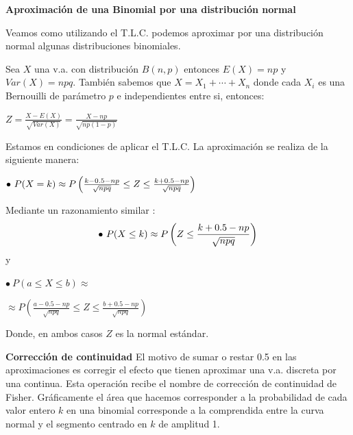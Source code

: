 \documentclass[12pt]{report}
\begin{document}
    \textbf{Aproximación de una Binomial por una distribución normal}

    Veamos como utilizando el T.L.C. podemos aproximar por una
    distribución normal algunas distribuciones binomiales.

    Sea $X$ una v.a. con distribución $B(n,p)$ entonces $E(X)=np$
    y $Var(X)=npq$. También sabemos que $X=X_{1}+\cdots + X_{n}$ donde
    cada $X_{i}$ es una Bernouilli de parámetro $p$ e independientes
    entre si, entonces:

    $Z=\frac{X-E(X)}{\sqrt{Var(X)}}=\frac{X-np}{\sqrt{np(1-p)}}$

    Estamos en condiciones de aplicar el T.L.C.
La aproximación se realiza de la siguiente manera:

$\bullet\  P(X=k)\approx P\left({{k-0.5-np}\over \sqrt{npq}}\leq Z \leq {{k+0.5-np}\over
\sqrt{npq}}\right)$


Mediante un razonamiento similar : $$\bullet\ P(X\leq k)\approx P\left(Z \leq
{{k+0.5-np}\over \sqrt{npq}}\right)$$ y

$\bullet\ P(a\leq X\leq b)\approx$

$\approx P\left(\frac{a-0.5-np}{\sqrt{npq}}\leq Z \leq \frac{b+0.5-np}{\sqrt{npq}}\right)$


Donde, en ambos casos $Z$ es la normal estándar.


\textbf{Corrección de continuidad} El motivo de sumar o restar 0.5 en las aproximaciones es
corregir el efecto que tienen aproximar una v.a. discreta por una continua. Esta operación
recibe el nombre de corrección de continuidad de Fisher. Gráficamente el área que hacemos
corresponder a la probabilidad de cada valor entero $k$ en una binomial corresponde a la
comprendida entre la curva normal y el  segmento centrado en $k$ de amplitud 1.
\end{document}
